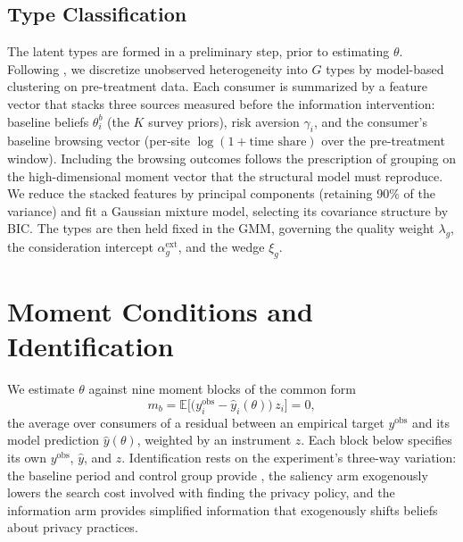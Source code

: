\documentclass[12pt]{article}
\theoremstyle{definition}
\newcommand{\E}{\mathbb{E}}
\theoremstyle{remark}
\begin{document}
{\subsection{Type Classification}

The latent types are formed in a preliminary step, prior to estimating $\theta$. Following \citet{bonhomme2022}, we discretize unobserved heterogeneity into $G$ types by model-based clustering on pre-treatment data. Each consumer is summarized by a feature vector that stacks three sources measured before the information intervention: baseline beliefs $\theta^b_i$ (the $K$ survey priors), risk aversion $\gamma_i$, and the consumer's baseline browsing vector (per-site $\log(1+\text{time share})$ over the pre-treatment window). Including the browsing outcomes follows the \citet{bonhomme2022} prescription of grouping on the high-dimensional moment vector that the structural model must reproduce. We reduce the stacked features by principal components (retaining 90\% of the variance) and fit a Gaussian mixture model, selecting its covariance structure by BIC. The types are then held fixed in the GMM, governing the quality weight $\lambda_g$, the consideration intercept $\alpha^{\text{ext}}_g$, and the wedge $\xi_g$.

\section{Moment Conditions and Identification}\label{sec:identification}\label{sec:em_moments}

We estimate $\theta$ against nine moment blocks of the common form
\begin{equation}\label{eq:em_moment}
  m_b = \E\bigl[\bigl(y^{\text{obs}}_{i} - \hat y_{i}(\theta)\bigr)\, z_{i}\bigr] = 0,
\end{equation}
the average over consumers of a residual between an empirical target $y^{\text{obs}}$ and its model prediction $\hat y(\theta)$, weighted by an instrument $z$. Each block below specifies its own $y^{\text{obs}}$, $\hat y$, and $z$. Identification rests on the experiment's three-way variation: the baseline period and control group provide , the saliency arm exogenously lowers the search cost involved with finding the privacy policy, and the information arm provides simplified information that exogenously shifts beliefs about privacy practices.

%

}
\end{document}
